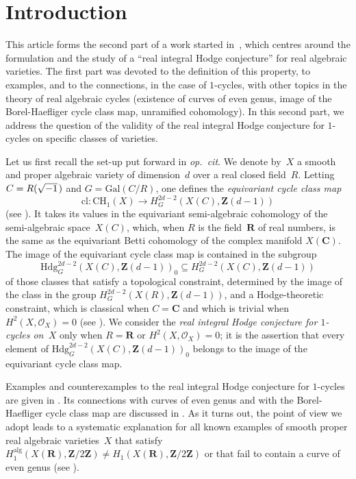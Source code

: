 \documentclass[JEP,XML,SOM,Unicode]{cedram}
\theoremstyle{plain}
\theoremstyle{definition}
\numberwithin{equation}{section}
\newcommand{\alg}{{\mathrm{alg}}}
\newcommand{\cl}{{\mathrm{cl}}}
\newcommand{\sO}{{\mathscr O}}
\renewcommand{\C}{{\mathbf C}}
\newcommand{\R}{{\mathbf R}}
\newcommand{\Z}{{\mathbf Z}}
\newcommand{\CH}{\mathrm{CH}}
\newcommand{\Hdg}{\mathrm{Hdg}}
\newcommand{\Gal}{\mathrm{Gal}}
\begin{document}
\section*{Introduction}
{\renewcommand*{\thethm}{\Alph{thm}}\setcounter{thm}{3}

This article forms the second part of a work started in~\cite{BW1},
which centres around the formulation and the study of
a ``real integral Hodge conjecture'' for real algebraic varieties.
The first part was devoted to the definition of this property,
to examples,
and to the connections, in the case of $1$\nobreakdash-cycles,
with other topics in the theory of real algebraic cycles
(existence of curves of even genus, image of the Borel-Haefliger cycle class
map, unramified cohomology).
In this second part,
we address the question of the validity of the real integral
Hodge conjecture for $1$\nobreakdash-cycles on
specific classes of varieties.

Let us first recall the set-up put forward in \emph{op.\ cit}.
We denote by~$X$ a smooth and proper algebraic variety of dimension~$d$
over a real closed field~$R$.
Letting $C=R(\sqrt{-1}\mkern2mu)$ and
$G=\Gal(C/R)$,
one defines
the \emph{equivariant cycle class map}
\[
\cl:\CH_1(X) \to H^{2d-2}_G(X(C),\Z(d-1))
\]
(see \cite[\textsection\ref*{BW1-subsubsec:eqcl}]{BW1}).
It takes its values in the equivariant semi-algebraic cohomology
of the semi-algebraic space~$X(C)$, which, when $R$ is the field~$\R$ of real numbers,
is the same as the equivariant Betti cohomology of the complex manifold $X(\C)$.
The image of the equivariant cycle class map is contained in
the subgroup
\[
\Hdg^{2d-2}_G(X(C),\Z(d-1))_0 \subseteq H^{2d-2}_G(X(C),\Z(d-1))
\]
of those classes that satisfy
a topological constraint, determined by the image of the class
in the group $H^{2d-2}_G(X(R),\Z(d-1))$, and a Hodge-theoretic constraint,
which is classical when $C=\C$ and which is trivial when $H^2(X,\sO_X)=0$
(see \cite[\textsection\ref*{BW1-par:realIHC}]{BW1}).
We consider the \emph{real integral Hodge conjecture for $1$\nobreakdash-cycles on~$X$}
only when $R=\R$ or $H^2(X,\sO_X)=0$; it
is the assertion that every element of
$\Hdg^{2d-2}_G(X(C),\Z(d-1))_0$
belongs to the image of the equivariant cycle class map.

Examples and counterexamples to the real integral Hodge conjecture for $1$\nobreakdash-cycles are given in \cite[\textsection\ref*{BW1-sec:realIHC},
\textsection\ref*{BW1-section:examples}]{BW1}. Its connections with
curves of even genus and with the Borel-Haefliger cycle class map
are discussed in \cite[\textsection\ref*{BW1-sec:onecycles}]{BW1}.
As it turns out, the point of view we adopt
leads to a systematic explanation for
all known examples of smooth proper real algebraic varieties~$X$ that
satisfy $H_1^\alg(X(\R),\Z/2\Z)\neq H_1(X(\R),\Z/2\Z)$
or that fail to contain a curve of
even genus
(see \cite[Rem.\,\ref*{BW1-rk:covers hknotalg}\,(i)
\& \textsection\ref*{BW1-section:examples}]{BW1}).

}
\end{document}

